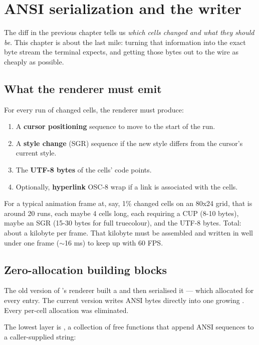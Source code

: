 \chapter{ANSI serialization and the writer}
\label{ch:ansi}

The diff in the previous chapter tells us \emph{which cells changed
and what they should be}. This chapter is about the last mile: turning
that information into the exact byte stream the terminal expects, and
getting those bytes out to the wire as cheaply as possible.

\section{What the renderer must emit}

For every run of changed cells, the renderer must produce:

\begin{enumerate}[leftmargin=*]
  \item A \textbf{cursor positioning} sequence to move to the start
    of the run.
  \item A \textbf{style change} (SGR) sequence if the new style
    differs from the cursor's current style.
  \item The \textbf{UTF-8 bytes} of the cells' code points.
  \item Optionally, \textbf{hyperlink} OSC-8 wrap if a link is
    associated with the cells.
\end{enumerate}

For a typical animation frame at, say, 1\% changed cells on an
80x24 grid, that is around 20 runs, each maybe 4 cells long, each
requiring a CUP (8-10 bytes), maybe an SGR (15-30 bytes for full
truecolour), and the UTF-8 bytes. Total: about a kilobyte per frame.
That kilobyte must be assembled and written in well under one frame
($\sim$16 ms) to keep up with 60 FPS.

\section{Zero-allocation building blocks}

The old version of \maya{}'s renderer built a 
and then serialised it --- which allocated for every entry. The
current version writes ANSI bytes directly into one growing
. Every per-cell allocation was eliminated.

The lowest layer is , a
collection of free functions that append ANSI sequences to a
caller-supplied string:

